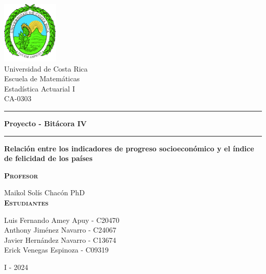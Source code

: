 \begin{titlepage}
\begin{center}
\vspace{2cm}
\includegraphics[width=0.2\textwidth]{root/Logo_ucr.png}~\\[1cm]

{\huge Universidad de Costa Rica} \\
{\large 
Escuela de Matemáticas \\
Estadística Actuarial I \\
CA-0303\\
}

\vspace{.5cm}


\hrule
\vspace{.5cm}
{ \Huge \bfseries Proyecto - Bitácora IV} 
\vspace{.5cm}
\hrule
\vspace{1cm}

{\Large \textbf{Relación entre los indicadores de progreso socioeconómico y el índice de felicidad de los países}}
\vspace{1cm}

\textsc{\textbf{Profesor}}\\
\vspace{2px}

Maikol Solís Chacón PhD \\

\vspace{.5cm}
\textsc{\textbf{Estudiantes}}\\
\vspace{2px}


Luis Fernando Amey Apuy - C20470\\
\vspace{5px}
Anthony Jiménez Navarro - C24067\\
\vspace{5px}
Javier Hernández Navarro - C13674\\
\vspace{5px}
Erick Venegas Espinoza - C09319\\

\vspace{1cm}

I - 2024 \\


\end{center}
\end{titlepage}